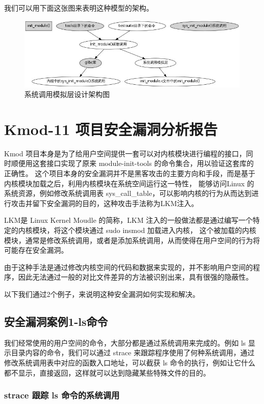 我们可以用下面这张图来表明这种模型的架构。

\begin{figure}[htbp]
\centering
\includegraphics{./figures/sys_sim.jpg}
\caption{系统调用模拟层设计架构图}
\end{figure}

\chapter{Kmod-11 项目安全漏洞分析报告}

Kmod
项目本身是为了给用户空间提供一套可以对内核模块进行编程的接口，同时顺便用这套接口实现了原来
module-init-tools 的命令集合，用以验证这套库的正确性。
这个项目本身的安全漏洞并不是黑客攻击的主要方向和手段，而是基于内核模块加载之后，利用内核模块在系统空间运行这一特性，
能够访问Linux 的系统资源，例如修改系统调用表
sys\_call\_table，可以影响内核的行为从而达到进行攻击并留下安全漏洞的目的，这种攻击手法称为LKM注入。

LKM是 Linux Kernel Moudle 的简称，LKM
注入的一般做法都是通过编写一个特定的内核模块，将这个模块通过 sudo insmod
加载进入内核，
这个被加载的内核模块，通常是修改系统调用，或者是添加系统调用，从而使得在用户空间的行为将可能存在安全漏洞。

由于这种手法是通过修改内核空间的代码和数据来实现的，并不影响用户空间的程序，因此无法通过一般的对比文件差异的方法被识别出来，具有很强的隐蔽性。

以下我们通过2个例子，来说明这种安全漏洞如何实现和解决。

\section{安全漏洞案例1-ls命令}

我们经常使用的用户空间的命令，大部分都是通过系统调用来完成的。例如 ls
显示目录内容的命令，我们可以通过 strace
来跟踪程序使用了何种系统调用，通过修改系统调用表中对应的函数入口地址，可以截获
ls
命令的执行，例如让它什么都不显示，直接返回，这样就可以达到隐藏某些特殊文件的目的。

\subsection{strace 跟踪 ls 命令的系统调用}

